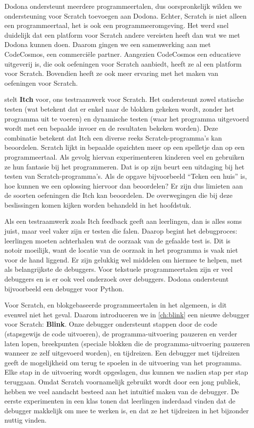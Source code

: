 \documentclass[main]{subfiles}
\begin{document}
Dodona ondersteunt meerdere programmeertalen, dus oorspronkelijk wilden we ondersteuning voor Scratch toevoegen aan Dodona.
Echter, Scratch is niet alleen een programmeertaal, het is ook een programmeeromgeving.
Het werd snel duidelijk dat een platform voor Scratch andere vereisten heeft dan wat we met Dodona kunnen doen.
Daarom gingen we een samenwerking aan met CodeCosmos, een commerciële partner.
Aangezien CodeCosmos een educatieve uitgeverij is, die ook oefeningen voor Scratch aanbiedt, heeft ze al een platform voor Scratch.
Bovendien heeft ze ook meer ervaring met het maken van oefeningen voor Scratch.

 stelt \textbf{Itch} voor, ons testraamwerk voor Scratch.
Het ondersteunt zowel statische testen (wat betekent dat er enkel naar de blokken gekeken wordt, zonder het programma uit te voeren) en dynamische testen (waar het programma uitgevoerd wordt met een bepaalde invoer en de resultaten bekeken worden).
Deze combinatie betekent dat Itch een diverse reeks Scratch-programma's kan beoordelen.
Scratch lijkt in bepaalde opzichten meer op een spelletje dan op een programmeertaal.
Als gevolg hiervan experimenteren kinderen veel en gebruiken ze hun fantasie bij het programmeren.
Dat is op zijn beurt een uitdaging bij het testen van Scratch-programma's.
Als de opgave bijvoorbeeld ``Teken een huis'' is, hoe kunnen we een oplossing hiervoor dan beoordelen?
Er zijn dus limieten aan de soorten oefeningen die Itch kan beoordelen.
De overwegingen die bij deze beslissingen komen kijken worden behandeld in het hoofdstuk.

Als een testraamwerk zoals Itch feedback geeft aan leerlingen, dan is alles soms juist, maar veel vaker zijn er testen die falen.
Daarop begint het debugproces: leerlingen moeten achterhalen wat de oorzaak van de gefaalde test is.
Dit is notoir moeilijk, want de locatie van de oorzaak in het programma is vaak niet voor de hand liggend.
Er zijn gelukkig wel middelen om hiermee te helpen, met als belangrijkste de debuggers.
Voor tekstuele programmeertalen zijn er veel debuggers en is er ook veel onderzoek over debuggers.
Dodona ondersteunt bijvoorbeeld een debugger voor Python.

Voor Scratch, en blokgebaseerde programmeertalen in het algemeen, is dit evenwel niet het geval.
Daarom introduceren we in \cref{ch:blink} een nieuwe debugger voor Scratch: \textbf{Blink}.
Onze debugger ondersteunt stappen door de code (stapsgewijs de code uitvoeren), de programma-uitvoering pauzeren en verder laten lopen, breekpunten (speciale blokken die de programma-uitvoering pauzeren wanneer ze zelf uitgevoerd worden), en tijdreizen.
Een debugger met tijdreizen geeft de mogelijkheid om terug te spoelen in de uitvoering van het programma.
Elke stap in de uitvoering wordt opgeslagen, dus kunnen we nadien stap per stap teruggaan.
Omdat Scratch voornamelijk gebruikt wordt door een jong publiek, hebben we veel aandacht besteed aan het intuïtief maken van de debugger.
De eerste experimenten in een klas tonen dat leerlingen inderdaad vinden dat de debugger makkelijk om mee te werken is, en dat ze het tijdreizen in het bijzonder nuttig vinden.
\end{document}
